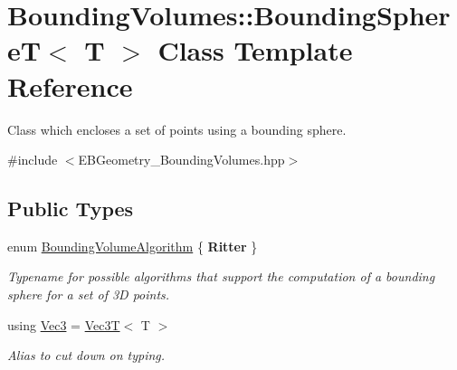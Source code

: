 \hypertarget{classBoundingVolumes_1_1BoundingSphereT}{}\section{Bounding\+Volumes\+:\+:Bounding\+SphereT$<$ T $>$ Class Template Reference}
\label{classBoundingVolumes_1_1BoundingSphereT}


Class which encloses a set of points using a bounding sphere.  




{\ttfamily \#include $<$E\+B\+Geometry\+\_\+\+Bounding\+Volumes.\+hpp$>$}

\subsection*{Public Types}
\begin{DoxyCompactItemize}
\item 
\mbox{\label{classBoundingVolumes_1_1BoundingSphereT_ae98cd00c8e45c93a0fc4fbabec63b007}} 
enum \hyperlink{classBoundingVolumes_1_1BoundingSphereT_ae98cd00c8e45c93a0fc4fbabec63b007}{Bounding\+Volume\+Algorithm} \{ {\bfseries Ritter}
 \}\begin{DoxyCompactList}\small\item\em Typename for possible algorithms that support the computation of a bounding sphere for a set of 3D points. \end{DoxyCompactList}
\item 
\mbox{\label{classBoundingVolumes_1_1BoundingSphereT_ad89ed315255abcde216e9ca1de3068ab}} 
using \hyperlink{classBoundingVolumes_1_1BoundingSphereT_ad89ed315255abcde216e9ca1de3068ab}{Vec3} = \hyperlink{classVec3T}{Vec3T}$<$ T $>$
\begin{DoxyCompactList}\small\item\em Alias to cut down on typing. \end{DoxyCompactList}\end{DoxyCompactItemize}
